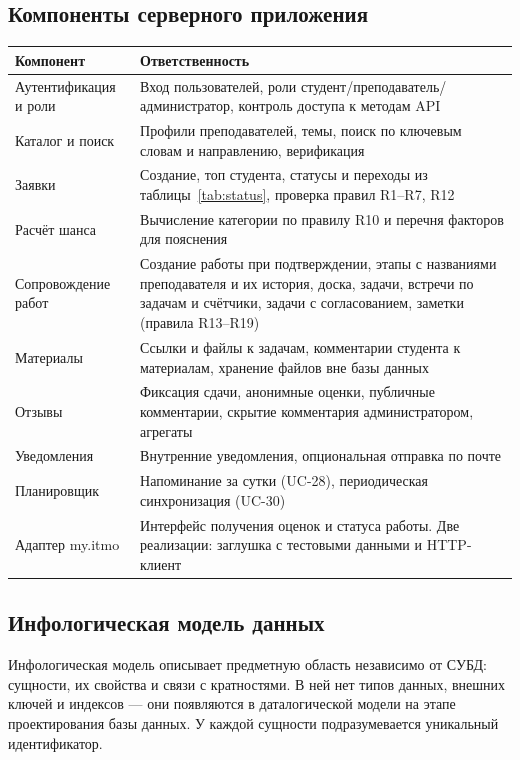 \documentclass[a4paper,12pt]{article}
\begin{document}
\subsection{Компоненты серверного приложения}
\begin{center}
\small
\begin{tabular}{|p{3.7cm}|p{11.1cm}|}
\hline
\textbf{Компонент} & \textbf{Ответственность}\\ \hline
Аутентификация и роли & Вход пользователей, роли студент/преподаватель/администратор, контроль доступа к методам API\\ \hline
Каталог и поиск & Профили преподавателей, темы, поиск по ключевым словам и направлению, верификация\\ \hline
Заявки & Создание, топ студента, статусы и переходы из таблицы~\ref{tab:status}, проверка правил R1–R7, R12\\ \hline
Расчёт шанса & Вычисление категории по правилу R10 и перечня факторов для пояснения\\ \hline
Сопровождение работ & Создание работы при подтверждении, этапы с названиями преподавателя и их история, доска, задачи, встречи по задачам и счётчики, задачи с согласованием, заметки (правила R13–R19)\\ \hline
Материалы & Ссылки и файлы к задачам, комментарии студента к материалам, хранение файлов вне базы данных\\ \hline
Отзывы & Фиксация сдачи, анонимные оценки, публичные комментарии, скрытие комментария администратором, агрегаты\\ \hline
Уведомления & Внутренние уведомления, опциональная отправка по почте\\ \hline
Планировщик & Напоминание за сутки (UC-28), периодическая синхронизация (UC-30)\\ \hline
Адаптер my.itmo & Интерфейс получения оценок и статуса работы. Две реализации: заглушка с тестовыми данными и HTTP-клиент\\ \hline
\end{tabular}
\end{center}

\subsection{Инфологическая модель данных}
Инфологическая модель описывает предметную область независимо от СУБД: сущности, их свойства и связи с кратностями. В ней нет типов данных, внешних ключей и индексов — они появляются в даталогической модели на этапе проектирования базы данных. У каждой сущности подразумевается уникальный идентификатор.
\end{document}

